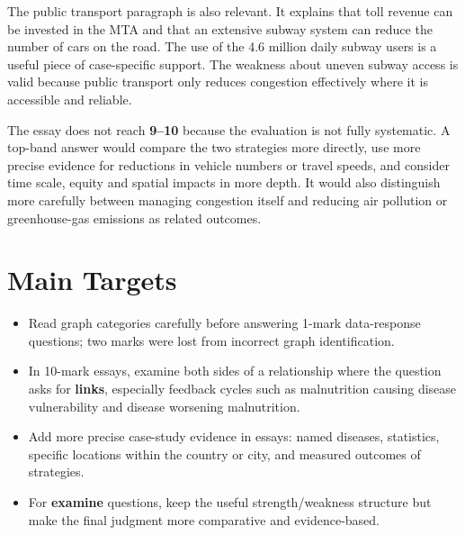 \documentclass[11pt,a4paper]{article}
\newcommand{\term}[1]{\textcolor{HeadingBlue}{\textbf{#1}}}
\newcommand{\score}[1]{\textcolor{AccentTeal}{\textbf{#1}}}
\begin{document}
The public transport paragraph is also relevant. It explains that toll revenue
can be invested in the MTA and that an extensive subway system can reduce the
number of cars on the road. The use of the 4.6 million daily subway users is a
useful piece of case-specific support. The weakness about uneven subway access
is valid because public transport only reduces congestion effectively where it
is accessible and reliable.

The essay does not reach \score{9--10} because the evaluation is not fully
systematic. A top-band answer would compare the two strategies more directly,
use more precise evidence for reductions in vehicle numbers or travel speeds,
and consider time scale, equity and spatial impacts in more depth. It would
also distinguish more carefully between managing congestion itself and reducing
air pollution or greenhouse-gas emissions as related outcomes.

\section{Main Targets}

\begin{itemize}
  \item Read graph categories carefully before answering 1-mark data-response
  questions; two marks were lost from incorrect graph identification.
  \item In 10-mark essays, examine both sides of a relationship where the
  question asks for \term{links}, especially feedback cycles such as
  malnutrition causing disease vulnerability and disease worsening
  malnutrition.
  \item Add more precise case-study evidence in essays: named diseases,
  statistics, specific locations within the country or city, and measured
  outcomes of strategies.
  \item For \term{examine} questions, keep the useful strength/weakness
  structure but make the final judgment more comparative and evidence-based.
\end{itemize}
\end{document}
